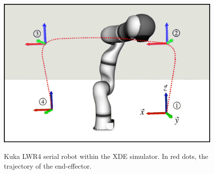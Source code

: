 \documentclass[a4paper, 10pt, conference]{ieeeconf}      %
\begin{document}
{{%
%
%
%
%
\begin{figure}
\centering
{\includegraphics[width=1.0\columnwidth]{figures/kuka_in_xde_VOID}}
\caption{Kuka LWR4 serial robot within the XDE simulator. In red dots, the trajectory of the end-effector.} 
\label{fig:kuka_in_xde_VOID}
\end{figure}

}}
\end{document}
